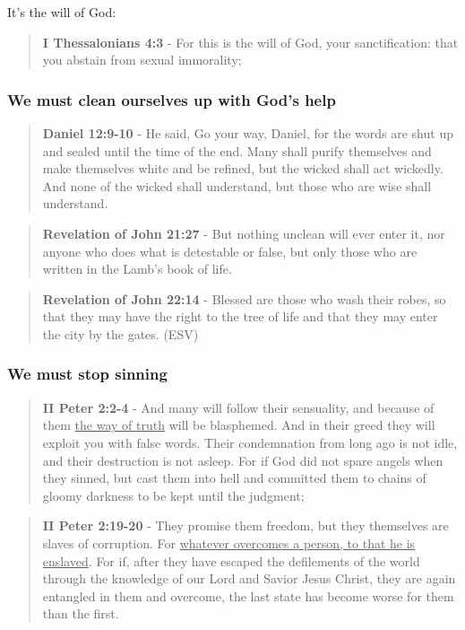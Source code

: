 \documentclass[11pt]{article}
\begin{document}
It's the will of God:

\begin{quote}
\textbf{I Thessalonians 4:3} - For this is the will of God, your sanctification: that you abstain from sexual immorality;
\end{quote}

\subsubsection{We \textbf{must} clean ourselves up with God's help}
\label{sec:orgdc76106}
\begin{quote}
\textbf{Daniel 12:9-10} - He said, Go your way, Daniel, for the words are shut up and sealed until the time of the end.  Many shall purify themselves and make themselves white and be refined, but the wicked shall act wickedly. And none of the wicked shall understand, but those who are wise shall understand.
\end{quote}

\begin{quote}
\textbf{Revelation of John 21:27} - But nothing unclean will ever enter it, nor anyone who does what is detestable or false, but only those who are written in the Lamb's book of life.
\end{quote}

\begin{quote}
\textbf{Revelation of John 22:14} - Blessed are those who wash their robes, so that they may have the right to the tree of life and that they may enter the city by the gates. (ESV)
\end{quote}

\subsubsection{We must stop sinning}
\label{sec:org4bd5851}

\begin{quote}
\textbf{II Peter 2:2-4} - And many will follow their sensuality, and because of them \uline{the way of truth} will be blasphemed. And in their greed they will exploit you with false words. Their condemnation from long ago is not idle, and their destruction is not asleep. For if God did not spare angels when they sinned, but cast them into hell and committed them to chains of gloomy darkness to be kept until the judgment;
\end{quote}

\begin{quote}
\textbf{II Peter 2:19-20} - They promise them freedom, but they themselves are slaves of corruption. For \uline{whatever overcomes a person, to that he is enslaved}. For if, after they have escaped the defilements of the world through the knowledge of our Lord and Savior Jesus Christ, they are again entangled in them and overcome, the last state has become worse for them than the first.
\end{quote}
\end{document}
